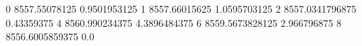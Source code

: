 0 8557.55078125 0.9501953125
1 8557.66015625 1.0595703125
2 8557.0341796875 0.43359375
4 8560.990234375 4.3896484375
6 8559.5673828125 2.966796875
8 8556.6005859375 0.0
